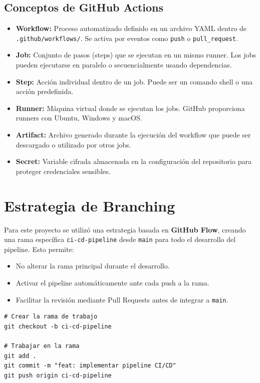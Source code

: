 \documentclass[12pt,a4paper]{article}
\begin{document}
\subsection{Conceptos de GitHub Actions}
\begin{itemize}
    \item \textbf{Workflow:} Proceso automatizado definido en un archivo YAML dentro de \texttt{.github/workflows/}. Se activa por eventos como \texttt{push} o \texttt{pull\_request}.
    \item \textbf{Job:} Conjunto de pasos (steps) que se ejecutan en un mismo runner. Los jobs pueden ejecutarse en paralelo o secuencialmente usando dependencias.
    \item \textbf{Step:} Acción individual dentro de un job. Puede ser un comando shell o una acción predefinida.
    \item \textbf{Runner:} Máquina virtual donde se ejecutan los jobs. GitHub proporciona runners con Ubuntu, Windows y macOS.
    \item \textbf{Artifact:} Archivo generado durante la ejecución del workflow que puede ser descargado o utilizado por otros jobs.
    \item \textbf{Secret:} Variable cifrada almacenada en la configuración del repositorio para proteger credenciales sensibles.
\end{itemize}

\section{Estrategia de Branching}

Para este proyecto se utilizó una estrategia basada en \textbf{GitHub Flow}, creando una rama específica \texttt{ci-cd-pipeline} desde \texttt{main} para todo el desarrollo del pipeline. Esto permite:

\begin{itemize}
    \item No alterar la rama principal durante el desarrollo.
    \item Activar el pipeline automáticamente ante cada push a la rama.
    \item Facilitar la revisión mediante Pull Requests antes de integrar a \texttt{main}.
\end{itemize}

\begin{lstlisting}[style=bashstyle]
# Crear la rama de trabajo
git checkout -b ci-cd-pipeline

# Trabajar en la rama
git add .
git commit -m "feat: implementar pipeline CI/CD"
git push origin ci-cd-pipeline
\end{lstlisting}
\end{document}
